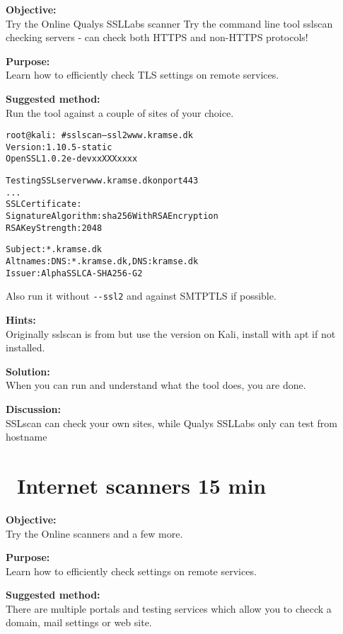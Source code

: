 \documentclass[a4paper,11pt,notitlepage]{report}
\begin{document}
{\bf Objective:}\\
Try the Online Qualys SSLLabs scanner 
Try the command line tool sslscan checking servers - can check both HTTPS and non-HTTPS protocols!

{\bf Purpose:}\\
Learn how to efficiently check TLS settings on remote services.

{\bf Suggested method:}\\
Run the tool against a couple of sites of your choice.

\begin{alltt}\small
root@kali:~# sslscan --ssl2 www.kramse.dk
Version: 1.10.5-static
OpenSSL 1.0.2e-dev xx XXX xxxx

Testing SSL server www.kramse.dk on port 443
...
  SSL Certificate:
Signature Algorithm: sha256WithRSAEncryption
RSA Key Strength:    2048

Subject:  *.kramse.dk
Altnames: DNS:*.kramse.dk, DNS:kramse.dk
Issuer:   AlphaSSL CA - SHA256 - G2
\end{alltt}

Also run it without \verb+--ssl2+ and against SMTPTLS if possible.

{\bf Hints:}\\
Originally sslscan is from  but use the version on Kali, install with apt if not installed.

{\bf Solution:}\\
When you can run and understand what the tool does, you are done.

{\bf Discussion:}\\
SSLscan can check your own sites, while Qualys SSLLabs only can test from hostname


\chapter{\faInfoCircle\ Internet scanners 15 min}
\label{ex:web-site-check}

{\bf Objective:}\\
Try the Online scanners  and a few more.

{\bf Purpose:}\\
Learn how to efficiently check settings on remote services.

{\bf Suggested method:}\\
There are multiple portals and testing services which allow you to checck a domain,
mail settings or web site.
\end{document}
